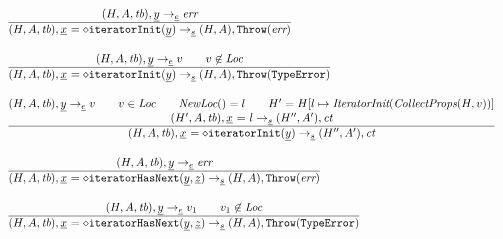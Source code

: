 \documentclass[a4paper, leqno]{amsart}
\newcommand{\rulesep}{\quad\quad}
\newcommand{\stmt}{s}
\newcommand{\expr}{e}
\newcommand{\ir}[1]{\ensuremath{\underline{#1}}}
\newcommand{\irid}{\ir{x}}
\newcommand{\tb}{\emph{tb}}
\newcommand{\err}{\emph{err}}
\newcommand{\te}{{\tt TypeError}}
\newcommand{\Loc}{\emph{Loc}}
\newcommand{\ct}{\emph{ct}}
\newcommand{\hf}[1]{\emph{#1}}
\newcommand{\error}{\ensuremath{{\tt Throw}(\err)}}
\newcommand{\thte}{\ensuremath{{\tt Throw}(\te)}}
\newcommand{\state}{\ensuremath{(H,A,\tb)}}
\newcommand{\res}{\ensuremath{(H,A)}}
\newcommand{\evale}{\ensuremath{(H,A,\tb)}}
\begin{document}
\[
\begin{array}{l@{~~}l@{~~}ll}
\frac{\begin{matrix}
\evale, \ir{y} \rightarrow_{\ir\expr} \err
\end{matrix}}{\begin{matrix}
\state, \irid \ {\tt = {\diamond}iteratorInit}(\ir{y})  \rightarrow_{\ir\stmt} \res, \error
\end{matrix}}
\\[2em]

\frac{\begin{matrix}
\evale, \ir{y} \rightarrow_{\ir\expr} v
\rulesep
v\not\in\Loc
\end{matrix}}{\begin{matrix}
\state, \irid \ {\tt = {\diamond}iteratorInit}(\ir{y})  \rightarrow_{\ir\stmt} \res, \thte
\end{matrix}}
\\[2em]

\frac{\begin{matrix}
\evale, \ir{y} \rightarrow_{\ir\expr} v
\rulesep
v\in\Loc
\rulesep
\hf{NewLoc}() = l
\rulesep
H' = H[l \mapsto \hf{IteratorInit}(\hf{CollectProps}(H,v))]
\\
(H', A, \tb), \irid \ {\tt =} \ l \rightarrow_{\ir\stmt} (H'', A'), \ct
\end{matrix}}{\begin{matrix}
\state, \irid \ {\tt = {\diamond}iteratorInit}(\ir{y})  \rightarrow_{\ir\stmt} (H'', A'), \ct
\end{matrix}}
\\[2em]

\frac{\begin{matrix}
\evale, \ir{y} \rightarrow_{\ir\expr} \err
\end{matrix}}{\begin{matrix}
\state, \irid \ {\tt = {\diamond}iteratorHasNext}(\ir{y}, \ir{z})  \rightarrow_{\ir\stmt} \res, \error
\end{matrix}}
\\[2em]

\frac{\begin{matrix}
\evale, \ir{y} \rightarrow_{\ir\expr} v_1
\rulesep
v_1\not\in\Loc
\end{matrix}}{\begin{matrix}
\state, \irid \ {\tt = {\diamond}iteratorHasNext}(\ir{y}, \ir{z})  \rightarrow_{\ir\stmt} \res, \thte
\end{matrix}}
\\[2em]


\end{array}\]
\end{document}
